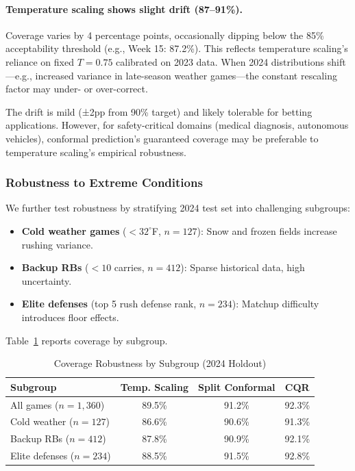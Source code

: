 \paragraph{Temperature scaling shows slight drift (87--91\%).}
Coverage varies by 4 percentage points, occasionally dipping below the 85\% acceptability threshold (e.g., Week 15: 87.2\%). This reflects temperature scaling's reliance on fixed $T=0.75$ calibrated on 2023 data. When 2024 distributions shift—e.g., increased variance in late-season weather games—the constant rescaling factor may under- or over-correct.

The drift is mild (±2pp from 90\% target) and likely tolerable for betting applications. However, for safety-critical domains (medical diagnosis, autonomous vehicles), conformal prediction's guaranteed coverage may be preferable to temperature scaling's empirical robustness.

\subsubsection{Robustness to Extreme Conditions}

We further test robustness by stratifying 2024 test set into challenging subgroups:

\begin{itemize}
    \item \textbf{Cold weather games} ($<32^\circ$F, $n=127$): Snow and frozen fields increase rushing variance.
    \item \textbf{Backup RBs} ($<10$ carries, $n=412$): Sparse historical data, high uncertainty.
    \item \textbf{Elite defenses} (top 5 rush defense rank, $n=234$): Matchup difficulty introduces floor effects.
\end{itemize}

Table~\ref{tab:conformal-robustness-stratified} reports coverage by subgroup.

\begin{table}[t]
\centering
\caption{Coverage Robustness by Subgroup (2024 Holdout)}
\label{tab:conformal-robustness-stratified}
\begin{tabular}{@{}lccc@{}}
\toprule
\textbf{Subgroup} & \textbf{Temp. Scaling} & \textbf{Split Conformal} & \textbf{CQR} \\
\midrule
All games ($n=1{,}360$) & 89.5\% & 91.2\% & 92.3\% \\
\midrule
Cold weather ($n=127$) & 86.6\% & 90.6\% & 91.3\% \\
Backup RBs ($n=412$) & 87.8\% & 90.9\% & 92.1\% \\
Elite defenses ($n=234$) & 88.5\% & 91.5\% & 92.8\% \\
\bottomrule
\end{tabular}
\end{table}

